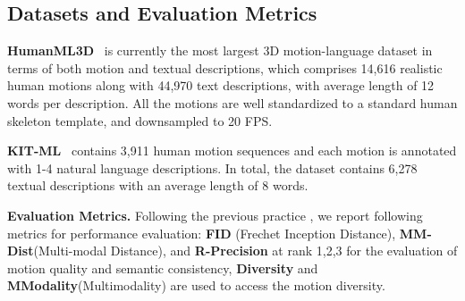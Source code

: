 \documentclass[letterpaper]{article} \usepackage{aaai24}
\begin{document}
\subsection{Datasets and Evaluation Metrics}

\noindent\textbf{HumanML3D}~\cite{guo2022generating} is currently the most largest 3D motion-language dataset in terms of both motion and textual descriptions, which comprises 14,616 realistic human motions along with 44,970 text descriptions, with average length of 12 words per description. 
All the motions are well standardized to a standard human skeleton template, and downsampled to 20 FPS.


\noindent\textbf{KIT-ML}~\cite{Plappert_2016} contains 3,911 human motion sequences and each motion is annotated with 1-4 natural language descriptions. In total, the dataset contains 6,278 textual descriptions with an average length of 8 words.







\noindent\textbf{Evaluation Metrics.} Following the previous practice \cite{guo2022generating}, we report following metrics for performance evaluation: \textbf{FID} (Frechet Inception Distance),  \textbf{MM-Dist}(Multi-modal Distance), and \textbf{R-Precision} at rank 1,2,3 for the  evaluation of motion quality and semantic consistency,  \textbf{Diversity} and  \textbf{MModality}(Multimodality) are used to access the motion diversity.

\iffalse
\begin{itemize}
\item \textbf{Frechet Inception Distance} (\textbf{FID}) evaluates the distribution distance of the feature space between the generated motions and the real motions. This is the primary metric representing the quality of the generated motion.
\item \textbf{Multi-modal Distance} (\textbf{MM-Dist}) evaluates the average Euclidean distance between the generated motion and the given text description in latent space, which measure the text-motion consistency.
\item \textbf{R-Precision} calculates the Top-1/2/3 matching accuracy within 32 pairs of motion and text in latent space.
    
\item \textbf{Diversity} calculates the average Euclidean distance of motion features within a test batch.
\item \textbf{Multimodality} (\textbf{MModality}) calculate the average Euclidean distance of motions features within the same text.
\end{itemize} 
\fi
\end{document}
